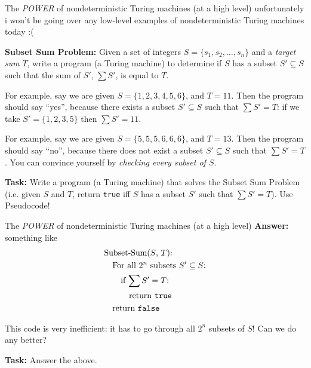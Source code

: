 \documentclass{beamer}
\begin{document}
\begin{frame}{The \textit{POWER} of nondeterministic Turing machines (at a high level)}
unfortunately i won't be going over any low-level examples of nondeterministic Turing machines today :(

\vspace{2mm}

\textbf{Subset Sum Problem:} Given a set of integers $S = \{s_1, s_2, \ldots, s_n\}$ and a \textit{target sum} $T$, write a program (a Turing machine) to determine if $S$ has a subset $S' \subseteq S$ such that the sum of $S'$, $\sum S'$, is equal to $T$. 

\vspace{2mm}

For example, say we are given $S = \{1, 2, 3, 4, 5, 6\}$, and $T = 11$. Then the program should say ``yes'', because there exists a subset $S' \subseteq S$ such that $\sum S' = T$: if we take $S' = \{1, 2, 3, 5\}$ then $\sum S' = 11$.

\vspace{2mm}

For example, say we are given $S = \{5, 5, 5, 6, 6, 6\}$, and $T = 13$. Then the program should say ``no'', because there does not exist a subset $S' \subseteq S$ such that $\sum S' = T$. You can convince yourself by \textit{checking every subset of $S$}.

\vspace{2mm}

\textbf{Task:} Write a program (a Turing machine) that solves the Subset Sum Problem (i.e. given $S$ and $T$, return \texttt{true} iff $S$ has a subset $S'$ such that $\sum S' = T$). Use Pseudocode!

\end{frame}

\begin{frame}{The \textit{POWER} of nondeterministic Turing machines (at a high level)}
\textbf{Answer:} something like
\begin{align*}
& \text{Subset-Sum($S$, $T$):}\\
& \quad \text{For all $2^n$ subsets $S' \subseteq S$:}\\
& \quad \quad \text{if $\sum S' = T$: }\\
& \quad \quad \quad \text{return \texttt{true}}\\
& \quad \text{return \texttt{false}}\\
\end{align*}

This code is very inefficient: it has to go through all $2^n$ subsets of $S$! Can we do any better? 

\textbf{Task:} Answer the above.

\end{frame}
\end{document}
